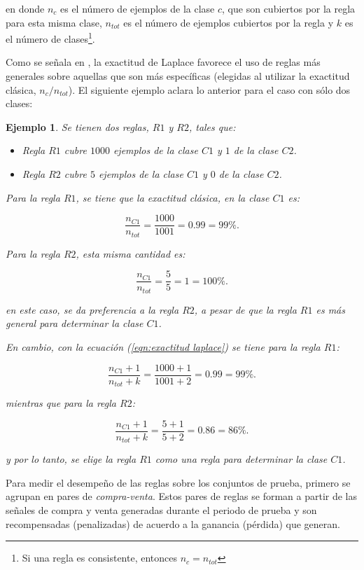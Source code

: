 \documentclass[12pt]{report}
\theoremstyle{break}
\newtheorem{ejemplo}{Ejemplo}[chapter]
\theoremstyle{break}
\begin{document}
en donde $n_c$ es el número de ejemplos de la clase $c$, que son cubiertos por la regla para esta misma clase, $n_{tot}$ es el número de ejemplos cubiertos por la regla y $k$ es el número de clases\footnote{Si una regla es consistente, entonces $n_c = n_{tot}$}.

Como se señala en \cite{CN2Improvements}, la exactitud de Laplace favorece el uso de reglas más generales sobre aquellas que son más específicas (elegidas al utilizar la exactitud clásica, $n_{c} / n_{tot} $). El siguiente ejemplo aclara lo anterior para el caso con sólo dos clases:

\begin{ejemplo}
Se tienen dos reglas, $R1$ y $R2$, tales que:

\begin{itemize} 
\item Regla $R1$ cubre $1000$ ejemplos de la clase $C1$ y $1$ de la clase $C2$.

\item Regla $R2$ cubre $5$ ejemplos de la clase $C1$ y $0$ de la clase $C2$.
\end{itemize}

Para la regla $R1$, se tiene que la exactitud clásica, en la clase $C1$ es:

$$ \dfrac{n_{C1}}{n_{tot}} = \dfrac{1000}{1001} = 0.99 = 99\%.$$

Para la regla $R2$, esta misma cantidad es:

$$ \dfrac{n_{C1}}{n_{tot}} = \dfrac{5}{5} = 1 = 100\%.$$

en este caso, se da preferencia a la regla $R2$, a pesar de que la regla $R1$ es más general para determinar la clase $C1$.

En cambio, con la ecuación (\ref{eqn:exactitud laplace}) se tiene para la regla $R1$:

$$ \dfrac{n_{C1} + 1}{n_{tot} + k} = \dfrac{1000 + 1}{1001 + 2} = 0.99 = 99\%.$$

mientras que para la regla $R2$:

$$ \dfrac{n_{C1} + 1}{n_{tot} + k} = \dfrac{5 + 1}{5 + 2} = 0.86 = 86\%.$$

y por lo tanto, se elige la regla $R1$ como una regla para determinar la clase $C1$.

\end{ejemplo}

Para medir el desempeño de las reglas sobre los conjuntos de prueba, primero se agrupan en pares de \textit{compra-venta}. Estos pares de reglas se forman a partir de las señales de compra y venta generadas durante el periodo de prueba y son recompensadas (penalizadas) de acuerdo a la ganancia (pérdida) que generan.
\end{document}
